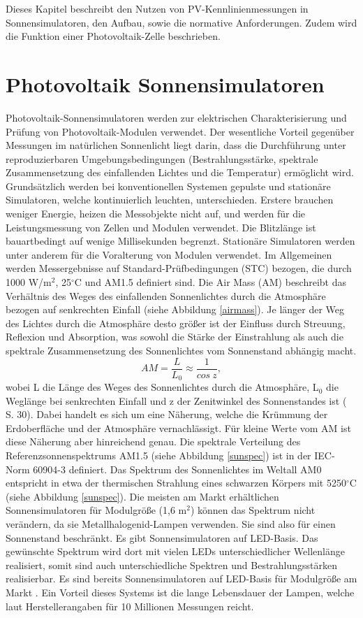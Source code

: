 \documentclass[a4paper,bibtotoc,oneside]{scrbook}
\begin{document}
Dieses Kapitel beschreibt den Nutzen von PV-Kennlinienmessungen in Sonnensimulatoren, den Aufbau, sowie die normative Anforderungen. Zudem wird die Funktion einer Photovoltaik-Zelle beschrieben.

\section{Photovoltaik Sonnensimulatoren} \thispagestyle{empty}

Photovoltaik-Sonnensimulatoren werden zur elektrischen Charakterisierung und Prüfung von Photovoltaik-Modulen verwendet. Der wesentliche Vorteil gegenüber Messungen im natürlichen Sonnenlicht liegt darin, dass die Durchführung unter reproduzierbaren Umgebungsbedingungen (Bestrahlungsstärke, spektrale Zusammensetzung des einfallenden Lichtes und die Temperatur)  ermöglicht wird. Grundsätzlich werden bei konventionellen Systemen gepulste und stationäre Simulatoren, welche kontinuierlich leuchten, unterschieden. Erstere brauchen weniger Energie, heizen die Messobjekte nicht auf, und werden für die Leistungsmessung von Zellen und Modulen verwendet. Die Blitzlänge ist bauartbedingt auf wenige Millisekunden begrenzt. Stationäre Simulatoren werden unter anderem für die Voralterung von Modulen verwendet.
Im Allgemeinen werden Messergebnisse auf Standard-Prüfbedingungen (STC) bezogen, die durch 1000 W/m$^2$, 25$^{\circ}$C und AM1.5 definiert sind. Die Air Mass (AM) beschreibt das Verhältnis des Weges des einfallenden Sonnenlichtes durch die Atmosphäre bezogen auf senkrechten Einfall (siehe Abbildung \ref{airmass}). Je länger der Weg des Lichtes durch die Atmosphäre desto größer ist der Einfluss durch Streuung, Reflexion und Absorption, was sowohl die Stärke der Einstrahlung als auch die spektrale Zusammensetzung des Sonnenlichtes vom Sonnenstand abhängig macht. 
\begin{equation}
     AM = \frac {L} {L_0} \approx \frac{1}{cos~ z},
\end{equation}
wobei L die Länge des Weges des Sonnenlichtes durch die Atmosphäre, L$_0$ die Weglänge bei senkrechten Einfall und z der Zenitwinkel des Sonnenstandes ist (\cite{wurf} S. 30). Dabei handelt es sich um eine Näherung, welche die Krümmung der Erdoberfläche und der Atmosphäre vernachlässigt. Für kleine Werte vom AM ist diese Näherung aber hinreichend genau.
Die spektrale Verteilung des Referenzsonnenspektrums AM1.5 (siehe Abbildung \ref{sunspec}) ist in der IEC-Norm 60904-3 \cite{norm3} definiert. Das Spektrum des Sonnenlichtes im Weltall AM0 entspricht in etwa der thermischen Strahlung eines schwarzen Körpers mit 5250$^\circ$C (siehe Abbildung \ref{sunspec}).
Die meisten am Markt erhältlichen Sonnensimulatoren für Modulgröße (1,6 m$^2$) können das Spektrum nicht verändern, da sie Metallhalogenid-Lampen verwenden. Sie sind also für einen Sonnenstand beschränkt. Es gibt Sonnensimulatoren auf LED-Basis. Das gewünschte Spektrum wird dort mit vielen LEDs unterschiedlicher Wellenlänge realisiert, somit sind auch unterschiedliche Spektren und Bestrahlungsstärken realisierbar. Es sind  bereits Sonnensimulatoren auf LED-Basis für Modulgröße am Markt \cite{mps}. Ein Vorteil dieses Systems ist die lange Lebensdauer der Lampen, welche laut Herstellerangaben für 10 Millionen Messungen reicht. 
\end{document}
